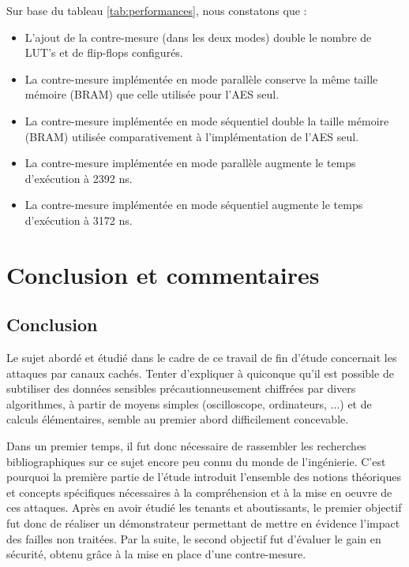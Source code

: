 \documentclass[oneside]{book}
\begin{document}
\hspace{-0.5cm}Sur base du tableau \ref{tab:performances}, nous constatons que : 
\begin{itemize}
\item L'ajout de la contre-mesure (dans les deux modes) double le nombre de LUT's et de flip-flops configurés.
\item La contre-mesure implémentée en mode parallèle conserve la même taille mémoire (BRAM) que celle utilisée pour l'AES seul.
\item La contre-mesure implémentée en mode séquentiel double la taille mémoire (BRAM) utilisée comparativement à l'implémentation de l'AES seul.
\item  La contre-mesure implémentée en mode parallèle augmente le temps d'exécution à 2392 \si{\nano\second}.
\item  La contre-mesure implémentée en mode séquentiel augmente le temps d'exécution à 3172 \si{\nano\second}.
\end{itemize}



\newpage


\vspace{-2cm}\chapter{Conclusion et commentaires}

\vspace{-1.25cm}\section{Conclusion}

\vspace{-0.35cm}Le sujet abordé et étudié dans le cadre de ce travail de fin d’étude concernait les attaques par canaux cachés. Tenter d’expliquer à quiconque qu’il est possible de subtiliser des données sensibles précautionneusement chiffrées par divers algorithmes, à partir de moyens simples (oscilloscope, ordinateurs, ...) et de calculs élémentaires, semble au premier abord difficilement concevable. 

Dans un premier temps, il fut donc nécessaire de rassembler les recherches bibliographiques sur ce sujet encore peu connu du monde de l'ingénierie. C'est pourquoi la première partie de l’étude introduit l’ensemble des notions théoriques et concepts spécifiques nécessaires à la compréhension et à la mise en oeuvre de ces attaques. Après en avoir étudié les tenants et aboutissants, le premier objectif fut donc de réaliser un démonstrateur permettant de mettre en évidence l’impact des failles non traitées. Par la suite, le second objectif fut d'évaluer le gain en sécurité, obtenu grâce à la mise en place d'une contre-mesure.
\end{document}
